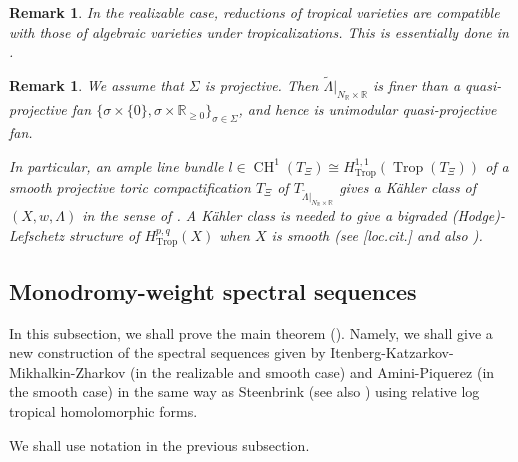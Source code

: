\documentclass[12pt,a4]{amsart}
\newtheorem{rem}[thm]{Remark}
\def\R{\mathbb{R}}
\def\CH{\mathop{\mathrm{CH}}\nolimits}
\def\Trop{\mathop{\mathrm{trop}}\nolimits}
\def\Trop{\mathop{\mathrm{Trop}}\nolimits}
\numberwithin{equation}{section}
\numberwithin{figure}{section}
\begin{document}
  \begin{rem}
   In the realizable case, reductions of tropical varieties 
    are compatible with those of algebraic varieties 
    under tropicalizations.
   This is essentially done in \cite{GublerAguidetotropicalizations2013}. 
  \end{rem}

  \begin{rem}\label{quasi-projectivity of polyhedral complex structures}
  We assume that $\Sigma$ is projective.
  Then
   $\tilde{\Lambda} |_{ N_\R  \times \R}$ is 
   finer than a quasi-projective fan
   $\{ \sigma \times \{ 0 \}, \sigma \times \R_{\geq 0} \}_{
     \sigma \in \Sigma }$,
     and hence is 
   unimodular quasi-projective fan. 

   In particular, 
     an ample line bundle $l \in \CH^1 (T_\Xi) \cong H^{1,1}_{\Trop} (\Trop (T_\Xi))$
     of a smooth projective toric compactification $T_\Xi$
      of $T_{\tilde{\Lambda} |_{   N_\R \times \R } } $ 
      gives a K\"{a}hler class of 
    $(X,w, \Lambda)$  
    in the sense of \cite[Definition 6.5]{AminiPiquerezHodgetheoryfortropicalvarieties2020}. 
    A K\"{a}hler class is needed to give 
    a bigraded (Hodge)-Lefschetz structure of $H^{p,q}_{\Trop}(X)$ when $X$ is smooth (see [loc.cit.] and also \cite{GuillenNavarroSurlethormelocaldescyclesinvariantsAznar1990}).
  \end{rem}

 \subsection{Monodromy-weight spectral sequences}\label{sub:monodromy_weight_spectral_sequences}
  In this subsection, 
  we shall prove the main theorem 
  (). 
  Namely, we shall give  
  a new construction of 
  the spectral sequences given by Itenberg-Katzarkov-Mikhalkin-Zharkov \cite{ItenbergKatzarkovMikhalkinZharkovTropicalhomology2019} 
  (in the realizable and smooth case)
  and Amini-Piquerez \cite{AminiPiquerezHodgetheoryfortropicalvarieties2020}  
  (in the smooth case)
  in the same way as Steenbrink \cite{SteenbrinkLimitsofHodgestructures1976} (see also \cite[Chapter 11]{PetersSteenbrinkMixedHodgestructures2008})
  using relative log tropical homolomorphic forms.

  We shall use notation in the previous subsection. 
\end{document}
